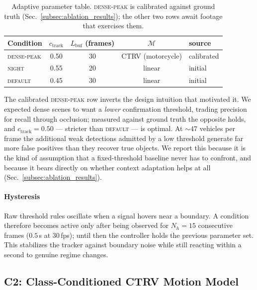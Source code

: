 \begin{table}[t]
  \centering
  \caption{Adaptive parameter table. \textsc{dense-peak} is calibrated
           against ground truth (Sec.~\ref{subsec:ablation_results});
           the other two rows await footage that exercises them.}
  \label{tab:param_table}
  \begin{tabular}{lcccl}
    \toprule
    Condition & $c_{\mathrm{track}}$ & $L_{\mathrm{buf}}$ (frames)
              & $\mathcal{M}$ & source \\
    \midrule
    \textsc{dense-peak} & 0.50 & 30 & CTRV (motorcycle) & calibrated \\
    \textsc{night}      & 0.55 & 20 & linear & initial \\
    \textsc{default}    & 0.45 & 30 & linear & initial \\
    \bottomrule
  \end{tabular}
\end{table}

The calibrated \textsc{dense-peak} row inverts the design intuition that
motivated it.
We expected dense scenes to want a \emph{lower} confirmation threshold,
trading precision for recall through occlusion; measured against ground
truth the opposite holds, and $c_{\mathrm{track}} = 0.50$ --- stricter
than \textsc{default} --- is optimal.
At $\sim$47 vehicles per frame the additional weak detections admitted by
a low threshold generate far more false positives than they recover true
objects.
We report this because it is the kind of assumption that a fixed-threshold
baseline never has to confront, and because it bears directly on whether
context adaptation helps at all (Sec.~\ref{subsec:ablation_results}).

\paragraph{Hysteresis}
Raw threshold rules oscillate when a signal hovers near a boundary.
A condition therefore becomes active only after being observed for
$N_h = 15$ consecutive frames ($0.5$\,s at 30\,fps); until then the
controller holds the previous parameter set.
This stabilizes the tracker against boundary noise while still
reacting within a second to genuine regime changes.

\subsection{C2: Class-Conditioned CTRV Motion Model}
\label{subsec:c2}

